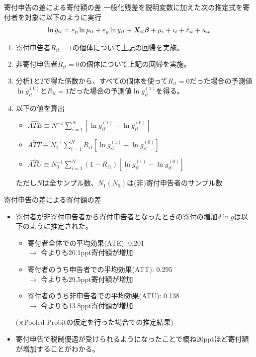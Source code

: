 \documentclass[dvipdfmx,10pt]{beamer}
\begin{document}
\begin{frame}{寄付申告の差による寄付額の差}
一般化残差を説明変数に加えた次の推定式を寄付者を対象に以下のように実行
		\begin{align}
			\ln g_{it} = \varepsilon_p\ln p_{it}+\varepsilon_y \ln y_{it} + \bm{X}_{it}\bm{\beta} + \mu_i + \iota_t + \hat{r}_{it}+u_{it}\notag
		\end{align}
		\begin{enumerate}
			\item 寄付申告者$R_{it}=1$の個体について上記の回帰を実施。
			\item 非寄付申告者$R_{it}=0$の個体について上記の回帰を実施。
			\item 分析1と2で得た係数から、すべての個体を使って$R_{it}=0$だった場合の予測値$\ln g_{it}^{(0)}$と$R_{it}=1$だった場合の予測値$\ln g_{it}^{(1)}$を得る。
			\item 以下の値を算出
			\begin{itemize}
				\item $\hat{ATE}\equiv N^{-1}\sum_{i=1}^N[\ln g_{it}^{(1)}-\ln g_{it}^{(0)}]$
				\item $\hat{ATT}\equiv N_1^{-1}\sum_{i=1}^NR_{i1}[\ln g_{it}^{(1)}-\ln g_{it}^{(0)}]$
				\item $\hat{ATU}\equiv N_0^{-1}\sum_{i=1}^N(1-R_{i1})[\ln g_{it}^{(1)}-\ln g_{it}^{(0)}]$
			\end{itemize}
			ただし$N$は全サンプル数、$N_1(N_0)$は(非)寄付申告者のサンプル数
		\end{enumerate}
	\end{frame}

\begin{frame}{寄付申告の差による寄付額の差}
	\begin{itemize}
		\item 寄付者が非寄付申告者から寄付申告者となったときの寄付の増加$d \ln g$は以下のように推定された。
		\begin{itemize}
			\item 寄付者全体での平均効果(ATE): 0.201\\
			$\to$ 今よりも20.1ppt寄付額が増加
			\item 寄付者のうち申告者での平均効果(ATT): 0.295\\
			$\to$ 今よりも29.5ppt寄付額が増加
			\item 寄付者のうち非申告者での平均効果(ATU): 0.138\\
			$\to$ 今よりも13.8ppt寄付額が増加
		\end{itemize}
		(※Pooled Probitの仮定を行った場合での推定結果)
		\item 寄付申告で税制優遇が受けられるようになったことで概ね20pptほど寄付額が増加することがわかる。
	\end{itemize}
\end{frame}
\end{document}
